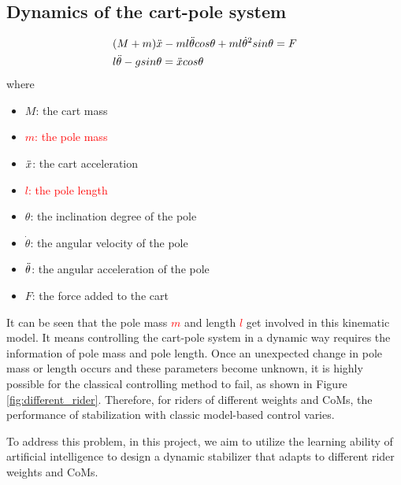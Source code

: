 \documentclass[10pt,a4paper]{article}
\begin{document}
\subsection*{Dynamics of the cart-pole system}
\begin{subequations}
\label{eq:dynamics}
\begin{align}
&(M + m)\Ddot{x} - ml\Ddot{\theta}cos\theta + ml\dot{\theta}^2sin\theta = F \\
&l\Ddot{\theta} - gsin\theta = \Ddot{x}cos\theta
\end{align}
\end{subequations}
where
\begin{multicols}{2}
\begin{itemize}
    \item $M$: the cart mass
    \item \textcolor{red}{$m$: the pole mass}
    \item $\Ddot{x}$: the cart acceleration 
    \item \textcolor{red}{$l$: the pole length}
    \item $\theta$: the inclination degree of the pole
    \item $\dot{\theta}$: the angular velocity of the pole
    \item $\Ddot{\theta}$: the angular acceleration of the pole
    \item $F$: the force added to the cart
\end{itemize}
\end{multicols}

It can be seen that the pole mass \textcolor{red}{$m$} and length \textcolor{red}{$l$} get involved in this kinematic model. It means controlling the cart-pole system in a dynamic way requires the information of pole mass and pole length. Once an unexpected change in pole mass or length occurs and these parameters become unknown, it is highly possible for the classical controlling method to fail, as shown in Figure \ref{fig:different_rider}.
Therefore, for riders of different weights and CoMs, the performance of stabilization with classic model-based control varies. 

To address this problem, in this project, we aim to utilize the learning ability of artificial intelligence to design a dynamic stabilizer that adapts to different rider weights and CoMs.
\end{document}
